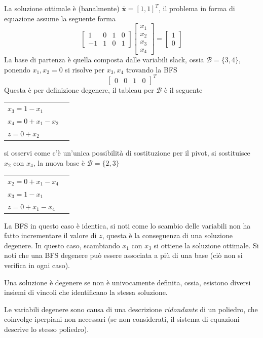\documentclass[10pt, letterpaper]{report}
\newcommand{\x}{{\mathbf{x}}}
\begin{document}
La soluzione ottimale è (banalmente) $\bar{\mathbf x}=[1,1]^T$, il problema in forma di equazione assume la seguente forma 
\begin{equation}
    \begin{bmatrix}
        1&0&1&0\\ 
        -1&1&0&1
    \end{bmatrix}\begin{bmatrix}
        x_1\\x_2\\x_3\\x_4
    \end{bmatrix}=\begin{bmatrix}
        1\\0
    \end{bmatrix}
\end{equation}
La base di partenza è quella composta dalle variabili slack, ossia $\mathcal B = \{3,4\}$, ponendo $x_1,x_2=0$ si risolve per $x_3,x_4$ trovando la BFS
$$ \begin{bmatrix}
    0 & 0 & 1 & 0
\end{bmatrix}^T$$
Questa è per definizione degenere, il tableau per $\mathcal B$ è il seguente 
\begin{center}
    \begin{tabular}{|l|l|}\hline 
        $x_3=1-x_1$\\ 
        $x_4=0+x_1-x_2$\\
        \hline 
        $z=0+x_2$ \\\hline 
    \end{tabular}
\end{center}
si osservi come c'è un'unica possibilità di sostituzione per il pivot, si sostituisce $x_2$ con $x_4$, la nuova base è $\mathcal B = \{2,3\}$ 
\begin{center}
    \begin{tabular}{|l|l|}\hline 
        $x_2=0+x_1-x_4$\\
        $x_3=1-x_1$\\ 
        \hline 
        $z=0+x_1-x_4$ \\\hline 
    \end{tabular}
\end{center}
La BFS in questo caso è identica, si noti come lo scambio delle variabili non ha fatto incrementare il valore di $z$, questa è la conseguenza di una soluzione degenere. In questo caso, scambiando $x_1$ con $x_3$ si ottiene la soluzione ottimale. Si noti che una BFS degenere può essere associata a più di una base (ciò non si verifica in ogni caso).
\begin{osservazione}
    Una soluzione è degenere se non è univocamente definita, ossia, esistono diversi insiemi di vincoli che identificano la stessa soluzione.
\end{osservazione}
Le variabili degenere sono causa di una descrizione \textit{ridondante} di un poliedro, che coinvolge iperpiani non necessari (se non considerati, il sistema di equazioni descrive lo stesso poliedro).
\end{document}
